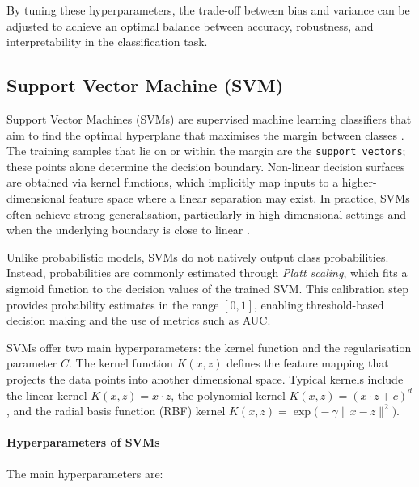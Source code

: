 By tuning these hyperparameters, the trade-off between bias and variance can be adjusted to achieve an optimal balance between accuracy, robustness, and interpretability in the classification task.

\subsection{Support Vector Machine (SVM)}\label{subsec:method-svm}

Support Vector Machines (SVMs) are supervised machine learning classifiers that aim to find the optimal hyperplane that maximises the margin between classes \citep{Cortes1995}. The training samples that lie on or within the margin are the \texttt{support vectors}; these points alone determine the decision boundary. Non-linear decision surfaces are obtained via kernel functions, which implicitly map inputs to a higher-dimensional feature space where a linear separation may exist. In practice, SVMs often achieve strong generalisation, particularly in high-dimensional settings and when the underlying boundary is close to linear \citep{chang2011guide}.

Unlike probabilistic models, SVMs do not natively output class probabilities. Instead, probabilities are commonly estimated through \textit{Platt scaling}, which fits a sigmoid function to the decision values of the trained SVM. This calibration step provides probability estimates in the range $[0,1]$, enabling threshold-based decision making and the use of metrics such as AUC.

SVMs offer two main hyperparameters: the kernel function and the regularisation parameter $C$. The kernel function $K(x,z)$ defines the feature mapping that projects the data points into another dimensional space. Typical kernels include the linear kernel $K(x,z)=x \cdot z$, the polynomial kernel $K(x,z)=(x \cdot z + c)^d$, and the radial basis function (RBF) kernel $K(x,z)=\exp\!\big(-\gamma \lVert x-z\rVert^2\big)$.\paragraph{Hyperparameters of SVMs} The main hyperparameters are:

